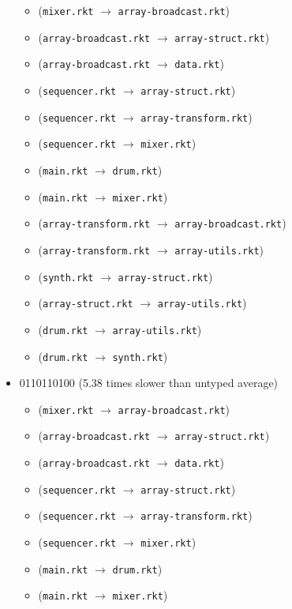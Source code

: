 \documentclass{article}
\newcommand{\mono}[1]{\texttt{#1}}
\begin{document}
\begin{itemize}
  \begin{itemize}
  \item (\mono{mixer.rkt} $\rightarrow$ \mono{array-broadcast.rkt})
  \item (\mono{array-broadcast.rkt} $\rightarrow$ \mono{array-struct.rkt})
  \item (\mono{array-broadcast.rkt} $\rightarrow$ \mono{data.rkt})
  \item (\mono{sequencer.rkt} $\rightarrow$ \mono{array-struct.rkt})
  \item (\mono{sequencer.rkt} $\rightarrow$ \mono{array-transform.rkt})
  \item (\mono{sequencer.rkt} $\rightarrow$ \mono{mixer.rkt})
  \item (\mono{main.rkt} $\rightarrow$ \mono{drum.rkt})
  \item (\mono{main.rkt} $\rightarrow$ \mono{mixer.rkt})
  \item (\mono{array-transform.rkt} $\rightarrow$ \mono{array-broadcast.rkt})
  \item (\mono{array-transform.rkt} $\rightarrow$ \mono{array-utils.rkt})
  \item (\mono{synth.rkt} $\rightarrow$ \mono{array-struct.rkt})
  \item (\mono{array-struct.rkt} $\rightarrow$ \mono{array-utils.rkt})
  \item (\mono{drum.rkt} $\rightarrow$ \mono{array-utils.rkt})
  \item (\mono{drum.rkt} $\rightarrow$ \mono{synth.rkt})
  \end{itemize}
\item 0110110100 (5.38 times slower than untyped average)
  \begin{itemize}
  \item (\mono{mixer.rkt} $\rightarrow$ \mono{array-broadcast.rkt})
  \item (\mono{array-broadcast.rkt} $\rightarrow$ \mono{array-struct.rkt})
  \item (\mono{array-broadcast.rkt} $\rightarrow$ \mono{data.rkt})
  \item (\mono{sequencer.rkt} $\rightarrow$ \mono{array-struct.rkt})
  \item (\mono{sequencer.rkt} $\rightarrow$ \mono{array-transform.rkt})
  \item (\mono{sequencer.rkt} $\rightarrow$ \mono{mixer.rkt})
  \item (\mono{main.rkt} $\rightarrow$ \mono{drum.rkt})
  \item (\mono{main.rkt} $\rightarrow$ \mono{mixer.rkt})

\end{itemize}
\end{itemize}
\end{document}
